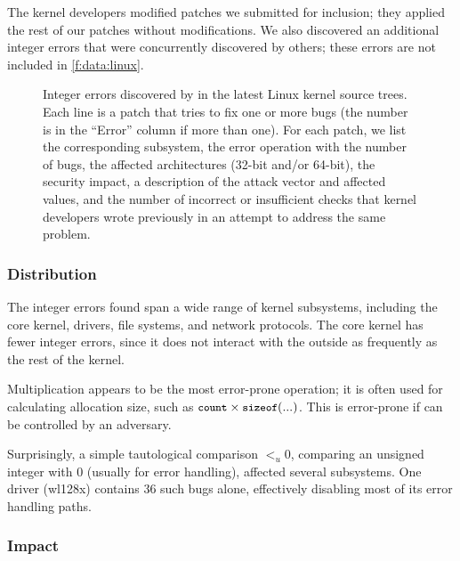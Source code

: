 The kernel developers modified \nrpatchesmod patches we submitted
for inclusion; they applied the rest of our patches without
modifications.
%
We also discovered an additional \nrbugsbyothers integer errors that
were concurrently discovered by others; these errors are not included
in \autoref{f:data:linux}.

\begin{figure*}
\centering
\footnotesize

\caption{Integer errors discovered by \sys in the latest Linux
kernel source trees.  Each line is a patch that tries to fix one
or more bugs (the number is in the ``Error'' column if more than
one).  For each patch, we list the corresponding subsystem, the
error operation with the number of bugs, the affected architectures
(32-bit and/or 64-bit), the security impact, a
description of the attack vector and affected values, and the number
of incorrect or insufficient checks that kernel developers wrote
previously in an attempt to address the same problem.}
\label{f:data:linux}
\end{figure*}

\subsubsection{Distribution}

The integer errors \sys found span a wide range of kernel subsystems,
including the core kernel, drivers, file systems, and network protocols.
The core kernel has fewer integer errors, since it does not
interact with the outside as frequently as the rest of the kernel.

Multiplication appears to be the most error-prone operation; it is
often used for calculating allocation size, such as $\cc{count}
\times \cc{sizeof}(...)$.  This is error-prone if  can
be controlled by an adversary.

Surprisingly,  a simple tautological comparison $<_u 0$,
comparing an unsigned integer with 0 (usually for error handling),
affected several subsystems.
One driver (wl128x) contains 36 such bugs alone, effectively
disabling most of its error handling paths.

\subsubsection{Impact}

